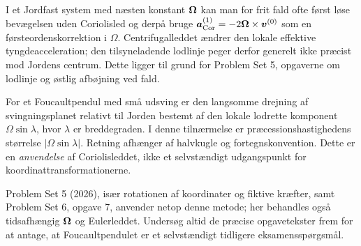 I et Jordfast system med næsten konstant $\boldsymbol{\Omega}$ kan man for frit fald ofte først løse bevægelsen uden Coriolisled og derpå bruge
$\boldsymbol{a}_{\rm Cor}^{(1)}=-2\boldsymbol{\Omega}\times\boldsymbol{v}^{(0)}$
som en førsteordenskorrektion i $\Omega$. Centrifugalleddet ændrer den lokale effektive tyngdeacceleration; den tilsyneladende lodlinje peger derfor generelt ikke præcist mod Jordens centrum. Dette ligger til grund for Problem Set 5, opgaverne om lodlinje og østlig afbøjning ved fald.

For et Foucaultpendul med små udsving er den langsomme drejning af svingningsplanet relativt til Jorden bestemt af den lokale lodrette komponent $\Omega\sin\lambda$, hvor $\lambda$ er breddegraden. I denne tilnærmelse er præcessionshastighedens størrelse $|\Omega\sin\lambda|$. Retning afhænger af halvkugle og fortegnskonvention. Dette er en \emph{anvendelse} af Coriolisleddet, ikke et selvstændigt udgangspunkt for koordinattransformationerne.

\begin{note}Problem Set 5 (2026), især rotationen af koordinater og fiktive kræfter, samt Problem Set 6, opgave 7, anvender netop denne metode; her behandles også tidsafhængig $\boldsymbol{\Omega}$ og Eulerleddet. Undersøg altid de præcise opgavetekster frem for at antage, at Foucaultpendulet er et selvstændigt tidligere eksamensspørgsmål.\end{note}
